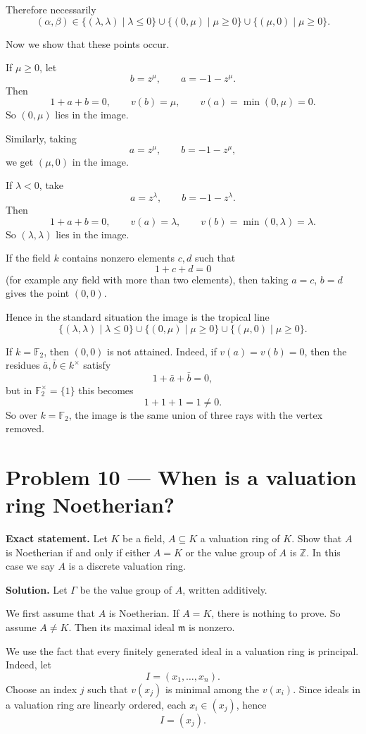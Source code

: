 \documentclass[12pt,a4paper]{article}
\theoremstyle{notespace}
\begin{document}
Therefore necessarily
\[
(\alpha,\beta)\in
\{(\lambda,\lambda)\mid \lambda\le 0\}
\cup
\{(0,\mu)\mid \mu\ge 0\}
\cup
\{(\mu,0)\mid \mu\ge 0\}.
\]

Now we show that these points occur.

If \(\mu\ge 0\), let
\[
b=z^\mu,\qquad a=-1-z^\mu.
\]
Then
\[
1+a+b=0,
\qquad
v(b)=\mu,
\qquad
v(a)=\min(0,\mu)=0.
\]
So \((0,\mu)\) lies in the image.

Similarly, taking
\[
a=z^\mu,\qquad b=-1-z^\mu,
\]
we get \((\mu,0)\) in the image.

If \(\lambda<0\), take
\[
a=z^\lambda,\qquad b=-1-z^\lambda.
\]
Then
\[
1+a+b=0,
\qquad
v(a)=\lambda,
\qquad
v(b)=\min(0,\lambda)=\lambda.
\]
So \((\lambda,\lambda)\) lies in the image.

If the field \(k\) contains nonzero elements \(c,d\) such that
\[
1+c+d=0
\]
(for example any field with more than two elements), then taking \(a=c\), \(b=d\) gives the point \((0,0)\).

Hence in the standard situation the image is the tropical line
\[
\{(\lambda,\lambda)\mid \lambda\le 0\}
\cup
\{(0,\mu)\mid \mu\ge 0\}
\cup
\{(\mu,0)\mid \mu\ge 0\}.
\]

\medskip

If \(k=\mathbb F_2\), then \((0,0)\) is not attained. Indeed, if \(v(a)=v(b)=0\), then the residues \(\bar a,\bar b\in k^\times\) satisfy
\[
1+\bar a+\bar b=0,
\]
but in \(\mathbb F_2^\times=\{1\}\) this becomes
\[
1+1+1=1\neq 0.
\]
So over \(k=\mathbb F_2\), the image is the same union of three rays with the vertex removed.

\bigskip

\section{Problem 10 --- When is a valuation ring Noetherian?}

\textbf{Exact statement.}
Let \(K\) be a field, \(A\subseteq K\) a valuation ring of \(K\). Show that \(A\) is Noetherian if and only if either \(A=K\) or the value group of \(A\) is \(\mathbb Z\). In this case we say \(A\) is a discrete valuation ring.

\textbf{Solution.}
Let \(\Gamma\) be the value group of \(A\), written additively.

We first assume that \(A\) is Noetherian. If \(A=K\), there is nothing to prove. So assume \(A\neq K\). Then its maximal ideal \(\mathfrak m\) is nonzero.

We use the fact that every finitely generated ideal in a valuation ring is principal. Indeed, let
\[
I=(x_1,\dots,x_n).
\]
Choose an index \(j\) such that \(v(x_j)\) is minimal among the \(v(x_i)\). Since ideals in a valuation ring are linearly ordered, each \(x_i\in (x_j)\), hence
\[
I=(x_j).
\]
\end{document}
